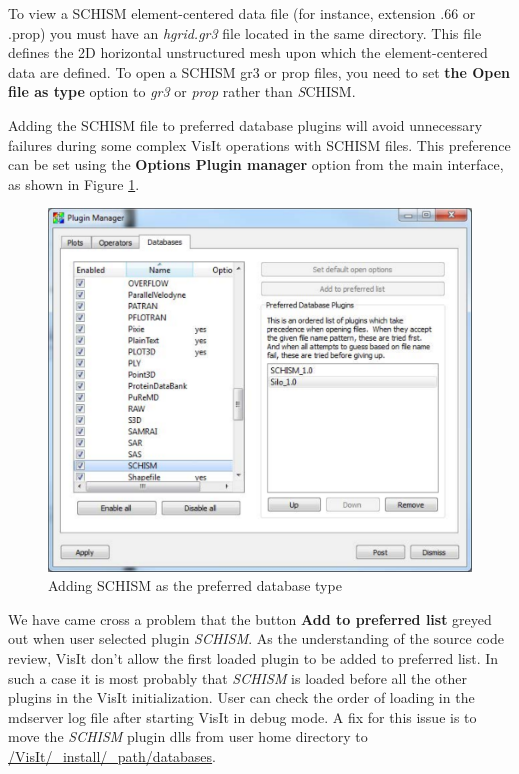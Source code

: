 \documentclass[12pt]{report}
\begin{document}
To view a SCHISM element-centered data file (for instance, extension .66 or .prop) you must have 
an \emph{hgrid.gr3} file located in the same directory.  This file defines the 2D horizontal 
unstructured mesh upon which the element-centered data are defined. 
To open a SCHISM gr3 or prop files, you need to set {\bf the Open file as type} option to \emph{gr3} or \emph{prop} rather than {\emph SCHISM}.

Adding the SCHISM file to preferred database plugins will avoid unnecessary failures during some complex VisIt operations with SCHISM files. This preference can be set using the {\bf Options \textrightarrow Plugin manager} 
option from the main interface, as shown in Figure \ref{figure:preferDatabase}.
	
        \begin{figure}
				\begin{center}
        \includegraphics{preferDatabase}
        \caption{Adding SCHISM as the preferred database type}
        \label{figure:preferDatabase}
        \end{center}
        \end{figure}
				
We have came cross a problem that the button {\bf Add to preferred list} greyed out when user selected plugin \emph{SCHISM}. As the understanding of the source code review, VisIt don't allow the first loaded plugin to be added to preferred list. In such a case it
is most probably that \emph{SCHISM} is loaded before all the other plugins in the VisIt initialization. User can check the order of
loading in the mdserver log file after starting VisIt in debug mode.  A fix for this issue is to move the \emph{SCHISM} plugin dlls
from user home directory to \url {/VisIt/_install/_path/databases}. 
				
\end{document}
